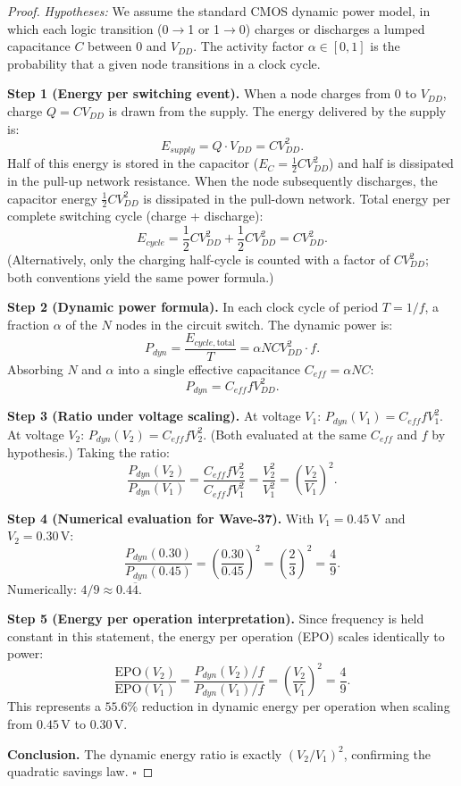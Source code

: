 \begin{proof}
\emph{Hypotheses:} We assume the standard CMOS dynamic power model, in which each logic
transition (0$\to$1 or 1$\to$0) charges or discharges a lumped capacitance $C$ between $0$
and $V_{DD}$.  The activity factor $\alpha \in [0,1]$ is the probability that a given node
transitions in a clock cycle.

\textbf{Step 1 (Energy per switching event).}
When a node charges from $0$ to $V_{DD}$, charge $Q = C V_{DD}$ is drawn from the supply.
The energy delivered by the supply is:
\[
  E_{supply} = Q \cdot V_{DD} = C V_{DD}^2.
\]
Half of this energy is stored in the capacitor ($E_C = \frac{1}{2} C V_{DD}^2$) and half
is dissipated in the pull-up network resistance.  When the node subsequently discharges, the
capacitor energy $\frac{1}{2} C V_{DD}^2$ is dissipated in the pull-down network.
Total energy per complete switching cycle (charge + discharge):
\[
  E_{cycle} = \frac{1}{2} C V_{DD}^2 + \frac{1}{2} C V_{DD}^2 = C V_{DD}^2.
\]
(Alternatively, only the charging half-cycle is counted with a factor of $C V_{DD}^2$;
both conventions yield the same power formula.)

\textbf{Step 2 (Dynamic power formula).}
In each clock cycle of period $T = 1/f$, a fraction $\alpha$ of the $N$ nodes in the circuit
switch.  The dynamic power is:
\[
  P_{dyn} = \frac{E_{cycle,\text{total}}}{T}
           = \alpha N C V_{DD}^2 \cdot f.
\]
Absorbing $N$ and $\alpha$ into a single effective capacitance $C_{eff} = \alpha N C$:
\[
  P_{dyn} = C_{eff} f V_{DD}^2. \tag{*}
\]

\textbf{Step 3 (Ratio under voltage scaling).}
At voltage $V_1$: $P_{dyn}(V_1) = C_{eff} f V_1^2$.
At voltage $V_2$: $P_{dyn}(V_2) = C_{eff} f V_2^2$.
(Both evaluated at the same $C_{eff}$ and $f$ by hypothesis.)
Taking the ratio:
\[
  \frac{P_{dyn}(V_2)}{P_{dyn}(V_1)} = \frac{C_{eff} f V_2^2}{C_{eff} f V_1^2} = \frac{V_2^2}{V_1^2}
  = \left(\frac{V_2}{V_1}\right)^2. \tag{**}
\]

\textbf{Step 4 (Numerical evaluation for Wave-37).}
With $V_1 = 0.45\,\text{V}$ and $V_2 = 0.30\,\text{V}$:
\[
  \frac{P_{dyn}(0.30)}{P_{dyn}(0.45)} = \left(\frac{0.30}{0.45}\right)^2
  = \left(\frac{2}{3}\right)^2 = \frac{4}{9}.
\]
Numerically: $4/9 \approx 0.4\overline{4}$.

\textbf{Step 5 (Energy per operation interpretation).}
Since frequency is held constant in this statement, the energy per operation (EPO) scales
identically to power:
\[
  \frac{\text{EPO}(V_2)}{\text{EPO}(V_1)} = \frac{P_{dyn}(V_2)/f}{P_{dyn}(V_1)/f}
  = \left(\frac{V_2}{V_1}\right)^2 = \frac{4}{9}.
\]
This represents a $55.6\%$ reduction in dynamic energy per operation when scaling from
$0.45\,\text{V}$ to $0.30\,\text{V}$.

\textbf{Conclusion.} The dynamic energy ratio is exactly $(V_2/V_1)^2$, confirming the
quadratic savings law. $\square$
\end{proof}

